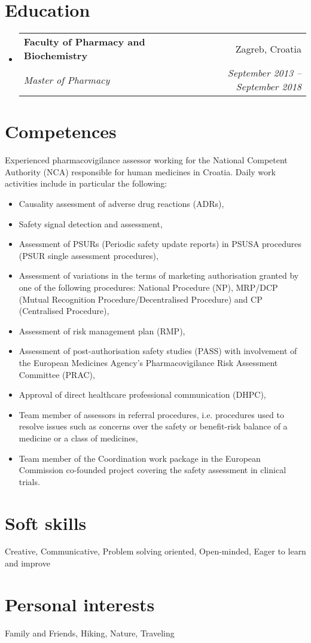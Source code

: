 \documentclass[letterpaper,11pt]{article}
\makeatletter
\newcommand{\resumeSubheading}[4]{
  \vspace{-2pt}\item
    \begin{tabular*}{0.97\textwidth}[t]{l@{\extracolsep{\fill}}r}
      \textbf{#1} & #2 \\
      \textit{\small#3} & \textit{\small #4} \\
    \end{tabular*}\vspace{-7pt}
}
\newcommand{\resumeSubHeadingListStart}{\begin{itemize}[leftmargin=0.15in, label={}]}
\newcommand{\resumeSubHeadingListEnd}{\end{itemize}}
\makeatother
\begin{document}
\section{{Education}}
  \resumeSubHeadingListStart
    \resumeSubheading
      {{Faculty of Pharmacy and Biochemistry}}{Zagreb, Croatia}
      {Master of Pharmacy}{September 2013 -- September 2018}
  \resumeSubHeadingListEnd
%
\section{{Competences}} 
Experienced pharmacovigilance assessor working for the National Competent Authority (NCA) responsible for human medicines in Croatia. 
Daily work activities include in particular the following:
\begin{itemize}
\item Causality assessment of adverse drug reactions (ADRs),
\item Safety signal detection and assessment,
\item Assessment of PSURs (Periodic safety update reports) in PSUSA procedures (PSUR single assessment procedures),
\item Assessment of variations in the terms of marketing authorisation granted by one of the following procedures: National Procedure (NP), MRP/DCP (Mutual Recognition Procedure/Decentralised Procedure) and CP (Centralised Procedure),
\item Assessment of risk management plan (RMP),
\item Assessment of post-authorisation safety studies (PASS) with involvement of the European Medicines Agency's Pharmacovigilance Risk Assessment Committee (PRAC),
\item Approval of direct healthcare professional communication (DHPC),
\item Team member of assessors in referral procedures, i.e. procedures used to resolve issues such as concerns over the safety or benefit-risk balance of a medicine or a class of medicines,
\item Team member of the Coordination work package in the European Commission co-founded project covering the safety assessment in clinical trials.
\end{itemize}

\section{{Soft skills}}
 \begin{itemize}[leftmargin=0.15in, label={}]
    \small{\item Creative, Communicative, Problem solving oriented, Open-minded, Eager to learn and improve}
 \end{itemize}

\section{{Personal interests}}
 \begin{itemize}[leftmargin=0.15in, label={}]
    \small{\item Family and Friends, Hiking, Nature, Traveling}
 \end{itemize}
\end{document}

